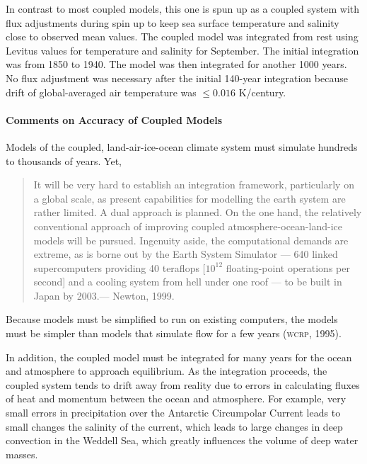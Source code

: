 In contrast to most coupled models, this one is spun up as a coupled system with flux
adjustments during spin up to keep sea surface temperature and salinity close to
observed mean values. The coupled model was integrated from rest  using Levitus
values for temperature and salinity for September. The initial integration was from
1850 to 1940. The model was then integrated for another 1000 years. No flux
adjustment was necessary after the initial 140-year integration because drift of
global-averaged air temperature was $\le 0.016$ K/century.

\paragraph{Comments on Accuracy of Coupled Models}
Models of the
coupled, land-air-ice-ocean climate system must simulate hundreds to thousands of years. Yet,
\begin{quote} \small
It will be very hard to establish an integration framework, particularly on a
global scale, as present capabilities for modelling the earth system are rather
limited. A dual approach is planned. On the one hand, the relatively conventional
approach of improving coupled atmosphere-ocean-land-ice models will be pursued.
Ingenuity aside, the computational demands are extreme, as is borne out by the
Earth System Simulator --- 640 linked supercomputers providing 40 teraflops
[$10^{12}$ floating-point operations per second] and a cooling system from hell
under one roof --- to be built in Japan by 2003.--- Newton, 1999.
\end{quote}
Because models must be simplified to run on existing computers, the models must be
simpler than models that simulate flow for a few years (\textsc{wcrp}, 1995).

In addition, the coupled model must be integrated for many years for the ocean and
atmosphere to approach equilibrium. As the integration proceeds, the coupled system
tends to drift away from reality due to errors in calculating fluxes of heat and
momentum between the ocean and atmosphere. For example, very small errors in
precipitation over the Antarctic Circumpolar Current leads to small changes the salinity of the  current, which leads to large changes in
deep convection in the Weddell Sea, which greatly influences the volume of deep water masses.

